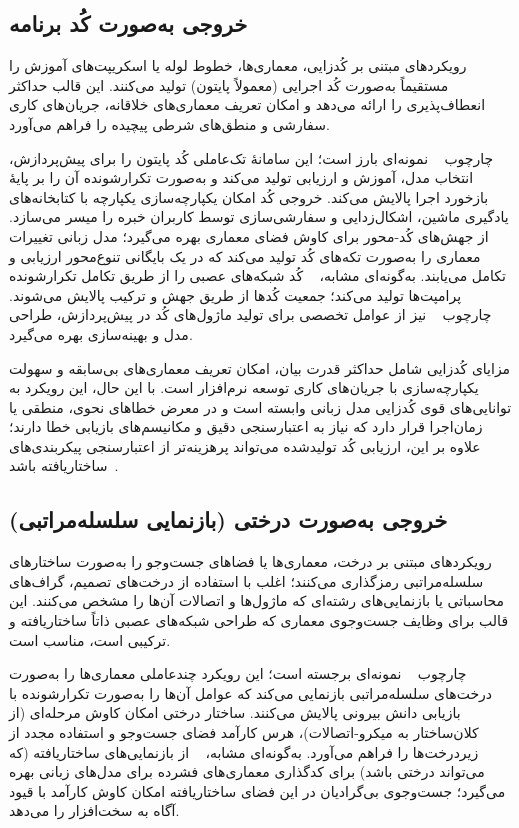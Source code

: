 \subsection{خروجی به‌صورت کُد برنامه}
رویکردهای مبتنی بر کُدزایی، معماری‌ها، خطوط لوله یا اسکریپت‌های آموزش را مستقیماً به‌صورت کُد اجرایی (معمولاً پایتون) تولید می‌کنند. این قالب حداکثر انعطاف‌پذیری را ارائه می‌دهد و امکان تعریف معماری‌های خلاقانه، جریان‌های کاری سفارشی و منطق‌های شرطی پیچیده را فراهم می‌آورد.

چارچوب ~\cite{zhang2023AutomlGPTAutomaticMachineLearning} نمونه‌ای بارز است؛ این سامانهٔ تک‌عاملی کُد پایتون را برای پیش‌پردازش، انتخاب مدل، آموزش و ارزیابی تولید می‌کند و به‌صورت تکرارشونده آن را بر پایهٔ بازخورد اجرا پالایش می‌کند. خروجی کُد امکان یکپارچه‌سازی یکپارچه با کتابخانه‌های یادگیری ماشین، اشکال‌زدایی و سفارشی‌سازی توسط کاربران خبره را میسر می‌سازد. ~\cite{LLMatic2024} از جهش‌های کُد-محور برای کاوش فضای معماری بهره می‌گیرد؛ مدل زبانی تغییرات معماری را به‌صورت تکه‌های کُد تولید می‌کند که در یک بایگانی تنوع‌محور ارزیابی و تکامل می‌یابند. به‌گونه‌ای مشابه، ~\cite{chen2023Evoprompting} کُد شبکه‌های عصبی را از طریق تکامل تکرارشونده پرامپت‌ها تولید می‌کند؛ جمعیت کُدها از طریق جهش و ترکیب پالایش می‌شوند. چارچوب ~\cite{trirat2025automlagent} نیز از عوامل تخصصی برای تولید ماژول‌های کُد در پیش‌پردازش، طراحی مدل و بهینه‌سازی بهره می‌گیرد.

مزایای کُدزایی شامل حداکثر قدرت بیان، امکان تعریف معماری‌های بی‌سابقه و سهولت یکپارچه‌سازی با جریان‌های کاری توسعه نرم‌افزار است. با این حال، این رویکرد به توانایی‌های قوی کُدزایی مدل زبانی وابسته است و در معرض خطاهای نحوی، منطقی یا زمان‌اجرا قرار دارد که نیاز به اعتبارسنجی دقیق و مکانیسم‌های بازیابی خطا دارند؛ علاوه بر این، ارزیابی کُد تولیدشده می‌تواند پرهزینه‌تر از اعتبارسنجی پیکربندی‌های ساختاریافته باشد~\cite{zhang2023AutomlGPTAutomaticMachineLearning,LLMatic2024}.

\subsection{خروجی به‌صورت درختی (بازنمایی سلسله‌مراتبی)}
رویکردهای مبتنی بر درخت، معماری‌ها یا فضاهای جست‌وجو را به‌صورت ساختارهای سلسله‌مراتبی رمزگذاری می‌کنند؛ اغلب با استفاده از درخت‌های تصمیم، گراف‌های محاسباتی یا بازنمایی‌های رشته‌ای که ماژول‌ها و اتصالات آن‌ها را مشخص می‌کنند. این قالب برای وظایف جست‌وجوی معماری که طراحی شبکه‌های عصبی ذاتاً ساختاریافته و ترکیبی است، مناسب است.

چارچوب ~\cite{Yang2025NADER} نمونه‌ای برجسته است؛ این رویکرد چندعاملی معماری‌ها را به‌صورت درخت‌های سلسله‌مراتبی بازنمایی می‌کند که عوامل آن‌ها را به‌صورت تکرارشونده با بازیابی دانش بیرونی پالایش می‌کنند. ساختار درختی امکان کاوش مرحله‌ای (از کلان‌ساختار به میکرو-اتصالات)، هرس کارآمد فضای جست‌وجو و استفاده مجدد از زیردرخت‌ها را فراهم می‌آورد. به‌گونه‌ای مشابه، ~\cite{sarah2024llamaNAS} از بازنمایی‌های ساختاریافته (که می‌تواند درختی باشد) برای کدگذاری معماری‌های فشرده برای مدل‌های زبانی بهره می‌گیرد؛ جست‌وجوی بی‌گرادیان در این فضای ساختاریافته امکان کاوش کارآمد با قیود آگاه به سخت‌افزار را می‌دهد.

